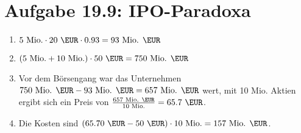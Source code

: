 \documentclass{article}
\begin{document}
	\section*{Aufgabe 19.9: IPO-Paradoxa}
	\begin{enumerate}[label=(\alph*)]
		\item $5\text{ Mio.}\cdot 20\text{ \EUR}\cdot 0.93 = 93 \text{ Mio. \EUR}$
		\item $(5\text{ Mio.} + 10\text{ Mio.})\cdot 50\text{ \EUR} = 750\text{ Mio. \EUR}$
		\item Vor dem Börsengang war das Unternehmen $750\text{ Mio. \EUR} - 93\text{ Mio. \EUR} = 657\text{ Mio. \EUR}$ wert, mit 10 Mio. Aktien ergibt sich ein Preis von $\frac{657\text{ Mio. \EUR}}{10\text{ Mio.}} = 65.7\text{ \EUR}$.
		\item Die Kosten sind $(65.70\text{ \EUR} - 50\text{ \EUR})\cdot 10\text{ Mio.} = 157\text{ Mio. \EUR}$.
	\end{enumerate}
\end{document}

